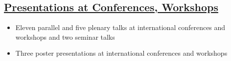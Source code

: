 \documentclass[a4paper,11pt]{article}
\begin{document}
{\subsection*{\underline{Presentations at Conferences, Workshops}}

\begin{itemize}
\item Eleven parallel and five plenary talks at international conferences and workshops and two seminar talks
\item Three poster presentations at international conferences and workshops
\end{itemize}

}
\end{document}
